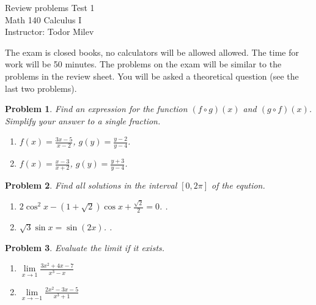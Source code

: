 \documentclass{article}
\newtheorem{problem}{Problem}
\begin{document}
\begin{center}
\Large
Review problems Test 1\\ Math 140 Calculus I \\ \normalsize Instructor: Todor Milev
\end{center}


\noindent The exam is closed books, no calculators will be allowed allowed. The time for work will be 50 minutes. The problems on the exam will be similar to the problems in the review sheet. You will be asked a theoretical question (see the last two problems).
\begin{problem}
Find an expression for the function $(f\circ g)(x)$ and $(g\circ f)(x)$. Simplify your answer to a single fraction. 
\begin{enumerate}
\item $ f(x)= \frac{3x-5}{x-2}$, $g(y)=\frac{y-2 }{y-4} $. 
\item $ f(x)= \frac{x-3}{x+2}$, $g(y)=\frac{y+3 }{y-4} $. 
\end{enumerate}
\end{problem}
\begin{problem}
Find all solutions in the interval $[0,2\pi]$ of the eqution.
\begin{enumerate}
\item $2\cos^{2}x-(1+\sqrt{2})\cos x+\frac{\sqrt{2}}{2}=0$. .
\item $\sqrt {3} \sin x= \sin (2x)$.  .
\end{enumerate}
\end{problem}
\begin{problem}
Evaluate the limit if it exists.
\begin{enumerate}
\item $\lim\limits_{x\to 1} \frac{3x^2+4x-7}{x^3-x}$ 
\item $\lim\limits_{x\to -1} \frac{2x^2-3x-5}{x^3+1}$ 
\end{enumerate}
\end{problem}
\end{document}
